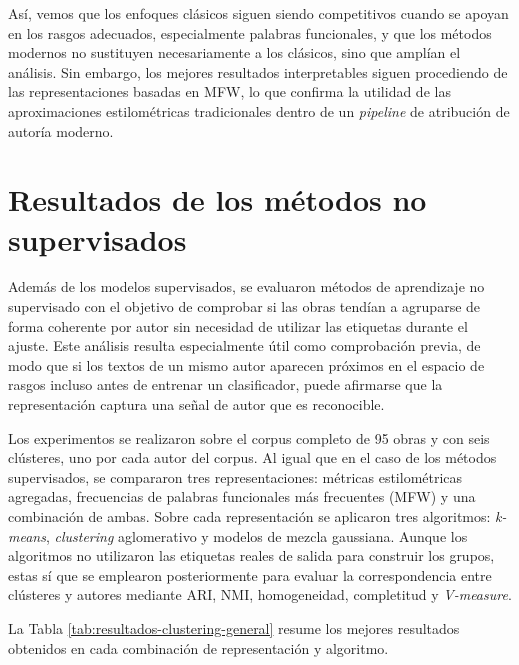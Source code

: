 \documentclass[IB]{TFUOC}%
\begin{document}
Así, vemos que los enfoques clásicos siguen siendo competitivos cuando se apoyan en los rasgos adecuados, especialmente palabras funcionales, y que los métodos modernos no sustituyen necesariamente a los clásicos, sino que amplían el análisis. Sin embargo, los mejores resultados interpretables siguen procediendo de las representaciones basadas en MFW, lo que confirma la utilidad de las aproximaciones estilométricas tradicionales dentro de un \textit{pipeline} de atribución de autoría moderno.

\section{Resultados de los métodos no supervisados}

Además de los modelos supervisados, se evaluaron métodos de aprendizaje no supervisado con el objetivo de comprobar si las obras tendían a agruparse de forma coherente por autor sin necesidad de utilizar las etiquetas durante el ajuste. Este análisis resulta especialmente útil como comprobación previa, de modo que si los textos de un mismo autor aparecen próximos en el espacio de rasgos incluso antes de entrenar un clasificador, puede afirmarse que la representación captura una señal de autor que es reconocible.

Los experimentos se realizaron sobre el corpus completo de 95 obras y con seis clústeres, uno por cada autor del corpus. Al igual que en el caso de los métodos supervisados, se compararon tres representaciones: métricas estilométricas agregadas, frecuencias de palabras funcionales más frecuentes (MFW) y una combinación de ambas. Sobre cada representación se aplicaron tres algoritmos: \textit{k-means}, \textit{clustering} aglomerativo y modelos de mezcla gaussiana. Aunque los algoritmos no utilizaron las etiquetas reales de salida para construir los grupos, estas sí que se emplearon posteriormente para evaluar la correspondencia entre clústeres y autores mediante ARI, NMI, homogeneidad, completitud y \textit{V-measure}.

La Tabla \ref{tab:resultados-clustering-general} resume los mejores resultados obtenidos en cada combinación de representación y algoritmo.
\end{document}

